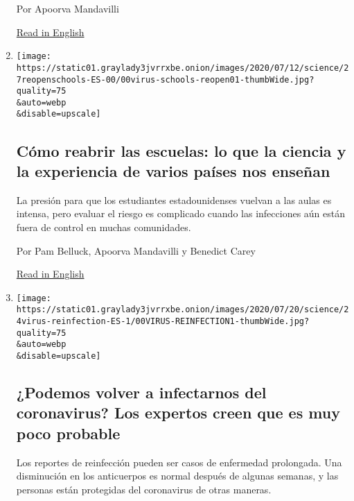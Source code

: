 \begin{enumerate}
  Por Apoorva Mandavilli

  \href{https://www.nytimes3xbfgragh.onion/2020/07/26/health/coronvirus-antibody-tests.html}{Read
  in English}
\item
  \href{/es/2020/07/27/espanol/ciencia-y-tecnologia/regreso-a-clases-coronavirus.html}{}

  \texttt{[image: https://static01.graylady3jvrrxbe.onion/images/2020/07/12/science/27reopenschools-ES-00/00virus-schools-reopen01-thumbWide.jpg?quality=75\\\&auto=webp\\\&disable=upscale]}

  \hypertarget{cuxf3mo-reabrir-las-escuelas-lo-que-la-ciencia-y-la-experiencia-de-varios-pauxedses-nos-enseuxf1an}{%
  \subsection{Cómo reabrir las escuelas: lo que la ciencia y la
  experiencia de varios países nos
  enseñan}\label{cuxf3mo-reabrir-las-escuelas-lo-que-la-ciencia-y-la-experiencia-de-varios-pauxedses-nos-enseuxf1an}}

  La presión para que los estudiantes estadounidenses vuelvan a las
  aulas es intensa, pero evaluar el riesgo es complicado cuando las
  infecciones aún están fuera de control en muchas comunidades.

  Por Pam Belluck, Apoorva Mandavilli y Benedict Carey

  \href{https://www.nytimes3xbfgragh.onion/2020/07/11/health/coronavirus-schools-reopen.html}{Read
  in English}
\item
  \href{/es/2020/07/24/espanol/ciencia-y-tecnologia/reinfeccion-coronavirus.html}{}

  \texttt{[image: https://static01.graylady3jvrrxbe.onion/images/2020/07/20/science/24virus-reinfection-ES-1/00VIRUS-REINFECTION1-thumbWide.jpg?quality=75\\\&auto=webp\\\&disable=upscale]}

  \hypertarget{podemos-volver-a-infectarnos-del-coronavirus-los-expertos-creen-que-es-muy-poco-probable}{%
  \subsection{¿Podemos volver a infectarnos del coronavirus? Los
  expertos creen que es muy poco
  probable}\label{podemos-volver-a-infectarnos-del-coronavirus-los-expertos-creen-que-es-muy-poco-probable}}

  Los reportes de reinfección pueden ser casos de enfermedad prolongada.
  Una disminución en los anticuerpos es normal después de algunas
  semanas, y las personas están protegidas del coronavirus de otras
  maneras.


\end{enumerate}
